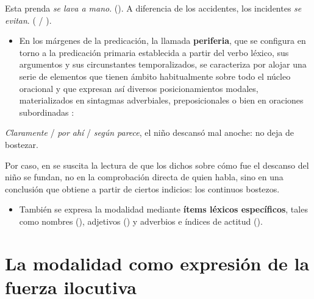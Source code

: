 \begin{exe}
  \ex\label{ex:14-prenda} Esta prenda \textit{se lava a mano}. ().
  \ex\label{ex:14-incidentes} A diferencia de los accidentes, los incidentes
      \textit{se evitan}. ( / ).
\end{exe}

\begin{itemize}
  \item En los márgenes de la predicación, la llamada \textbf{periferia}, que se
        configura en torno a la predicación primaria establecida a partir del
        verbo léxico, sus argumentos y sus circunstantes temporalizados, se
        caracteriza por alojar una serie de elementos que tienen ámbito
        habitualmente sobre todo el núcleo oracional y que expresan así diversos
        posicionamientos modales, materializados en sintagmas adverbiales,
        preposicionales o bien en oraciones subordinadas :
\end{itemize}

\begin{exe}
  \ex\label{ex:14-nino} \textit{Claramente} / \textit{por ahí} / \textit{según
      parece}, el niño descansó mal anoche: no deja de bostezar.
\end{exe}

Por caso, en  se suscita la lectura de que los dichos sobre
cómo fue el descanso del niño se fundan, no en la comprobación directa de quien
habla, sino en una conclusión que obtiene a partir de ciertos indicios: los
continuos bostezos.

\begin{itemize}
  \item También se expresa la modalidad mediante \textbf{ítems léxicos
        específicos}, tales como nombres (), adjetivos () y adverbios e índices de actitud ().
\end{itemize}

\section{La modalidad como expresión de la fuerza ilocutiva}\label{sec:14-ilocutiva}


